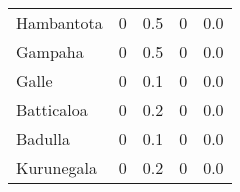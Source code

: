 \begin{tabular}{lrrrr}
Hambantota   &              0 &                 0.5 &              0 &                 0.0 \\
Gampaha      &              0 &                 0.5 &              0 &                 0.0 \\
Galle        &              0 &                 0.1 &              0 &                 0.0 \\
Batticaloa   &              0 &                 0.2 &              0 &                 0.0 \\
Badulla      &              0 &                 0.1 &              0 &                 0.0 \\
Kurunegala   &              0 &                 0.2 &              0 &                 0.0 \\
\bottomrule
\end{tabular}
